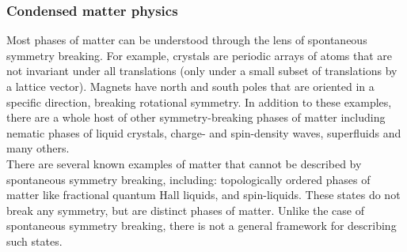 \subsubsection{Condensed matter physics}
Most phases of matter can be understood through the lens of spontaneous symmetry breaking. For example, crystals are periodic arrays of atoms that are not invariant under all translations (only under a small subset of translations by a lattice vector). Magnets have north and south poles that are oriented in a specific direction, breaking rotational symmetry. In addition to these examples, there are a whole host of other symmetry-breaking phases of matter including nematic phases of liquid crystals, charge- and spin-density waves, superfluids and many others.\\
There are several known examples of matter that cannot be described by spontaneous symmetry breaking, including: topologically ordered phases of matter like fractional quantum Hall liquids, and spin-liquids. These states do not break any symmetry, but are distinct phases of matter. Unlike the case of spontaneous symmetry breaking, there is not a general framework for describing such states.


